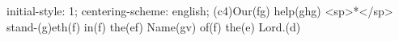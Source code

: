 initial-style: 1;
centering-scheme: english;
(c4)Our(fg) help(ghg) <sp>*</sp> stand-(g)eth(f) in(f) the(ef) Name(gv) of(f) the(e) Lord.(d)